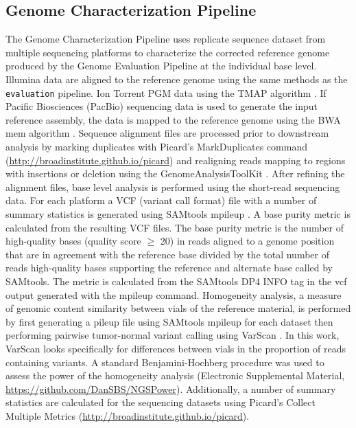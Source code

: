 \documentclass[smallextended]{svjour3}\usepackage[]{graphicx}\usepackage[]{color}
\begin{document}
\subsection{Genome Characterization Pipeline}
\label{method:3}
The Genome Characterization Pipeline uses replicate sequence dataset from multiple sequencing platforms to characterize the corrected reference genome produced by the Genome Evaluation Pipeline at the individual base level. 
Illumina data are aligned to the reference genome using the same methods as the \texttt{evaluation} pipeline. 
Ion Torrent PGM data using the TMAP algorithm \cite{Homer}. 
If Pacific Biosciences (PacBio) sequencing data is used to generate the input reference assembly, the data is mapped to the reference genome using the BWA mem algorithm \cite{Li2013c}. Sequence alignment files are processed prior to downstream analysis by marking duplicates with Picard's MarkDuplicates command (\url{http://broadinstitute.github.io/picard}) and realigning reads mapping to regions with insertions or deletion using the GenomeAnalysisToolKit \cite{McKenna2010,DePristo2011}. 
After refining the alignment files, base level analysis is performed using the short-read sequencing data. 
For each platform a VCF (variant call format) file with a number of summary statistics is generated using SAMtools mpileup \cite{Li2009}. 
A base purity metric is calculated from the resulting VCF files. 
The base purity metric is the number of high-quality bases (quality score $\geq$ 20) in reads aligned to a genome position that are in agreement with the reference base divided by the total number of reads high-quality bases supporting the reference and alternate base called by SAMtools. 
The metric is calculated from the SAMtools DP4 INFO tag in the vcf output generated with the mpileup command.
Homogeneity analysis, a measure of genomic content similarity between vials of the reference material, is performed by first generating a pileup file using SAMtools mpileup for each dataset then performing pairwise tumor-normal variant calling using VarScan \cite{Koboldt2009}. 
In this work, VarScan looks specifically for differences between vials in the proportion of reads containing variants. 
A standard Benjamini-Hochberg procedure was used to assess the power of the homogeneity analysis (Electronic Supplemental Material, \url{https://github.com/DanSBS/NGSPower}). 
Additionally, a number of summary statistics are calculated for the sequencing datasets using Picard's Collect Multiple Metrics (\url{http://broadinstitute.github.io/picard}). 
\end{document}
